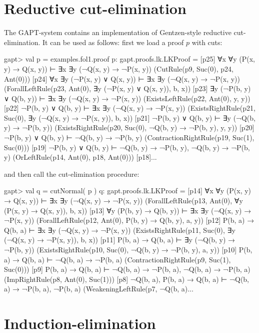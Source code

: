 \documentclass[a4paper,11pt]{book}
\begin{document}
\section{Reductive cut-elimination}

The GAPT-system contains an implementation of Gentzen-style reductive
cut-elimination.  It can be used as follows: first we load a proof $p$ with
cuts:

\begin{clilisting}
gapt> val p = examples.fol1.proof
p: gapt.proofs.lk.LKProof =
[p25] ∀x ∀y (P(x, y) → Q(x, y)) ⊢ ∃x ∃y (¬Q(x, y) → ¬P(x, y))    (CutRule(p9, Suc(0), p24, Ant(0)))
[p24] ∀x ∃y (¬P(x, y) ∨ Q(x, y)) ⊢ ∃x ∃y (¬Q(x, y) → ¬P(x, y))    (ForallLeftRule(p23, Ant(0), ∃y (¬P(x, y) ∨ Q(x, y)), b, x))
[p23] ∃y (¬P(b, y) ∨ Q(b, y)) ⊢ ∃x ∃y (¬Q(x, y) → ¬P(x, y))    (ExistsLeftRule(p22, Ant(0), y, y))
[p22] ¬P(b, y) ∨ Q(b, y) ⊢ ∃x ∃y (¬Q(x, y) → ¬P(x, y))    (ExistsRightRule(p21, Suc(0), ∃y (¬Q(x, y) → ¬P(x, y)), b, x))
[p21] ¬P(b, y) ∨ Q(b, y) ⊢ ∃y (¬Q(b, y) → ¬P(b, y))    (ExistsRightRule(p20, Suc(0), ¬Q(b, y) → ¬P(b, y), y, y))
[p20] ¬P(b, y) ∨ Q(b, y) ⊢ ¬Q(b, y) → ¬P(b, y)    (ContractionRightRule(p19, Suc(1), Suc(0)))
[p19] ¬P(b, y) ∨ Q(b, y) ⊢ ¬Q(b, y) → ¬P(b, y), ¬Q(b, y) → ¬P(b, y)    (OrLeftRule(p14, Ant(0), p18, Ant(0)))
[p18]...

\end{clilisting}
%
and then call the cut-elimination procedure:
\begin{clilisting}
gapt> val q = cutNormal( p )
q: gapt.proofs.lk.LKProof =
[p14] ∀x ∀y (P(x, y) → Q(x, y)) ⊢ ∃x ∃y (¬Q(x, y) → ¬P(x, y))    (ForallLeftRule(p13, Ant(0), ∀y (P(x, y) → Q(x, y)), b, x))
[p13] ∀y (P(b, y) → Q(b, y)) ⊢ ∃x ∃y (¬Q(x, y) → ¬P(x, y))    (ForallLeftRule(p12, Ant(0), P(b, y) → Q(b, y), a, y))
[p12] P(b, a) → Q(b, a) ⊢ ∃x ∃y (¬Q(x, y) → ¬P(x, y))    (ExistsRightRule(p11, Suc(0), ∃y (¬Q(x, y) → ¬P(x, y)), b, x))
[p11] P(b, a) → Q(b, a) ⊢ ∃y (¬Q(b, y) → ¬P(b, y))    (ExistsRightRule(p10, Suc(0), ¬Q(b, y) → ¬P(b, y), a, y))
[p10] P(b, a) → Q(b, a) ⊢ ¬Q(b, a) → ¬P(b, a)    (ContractionRightRule(p9, Suc(1), Suc(0)))
[p9] P(b, a) → Q(b, a) ⊢ ¬Q(b, a) → ¬P(b, a), ¬Q(b, a) → ¬P(b, a)    (ImpRightRule(p8, Ant(0), Suc(1)))
[p8] ¬Q(b, a), P(b, a) → Q(b, a) ⊢ ¬Q(b, a) → ¬P(b, a), ¬P(b, a)    (WeakeningLeftRule(p7, ¬Q(b, a)...

\end{clilisting}

\section{Induction-elimination}
\end{document}
